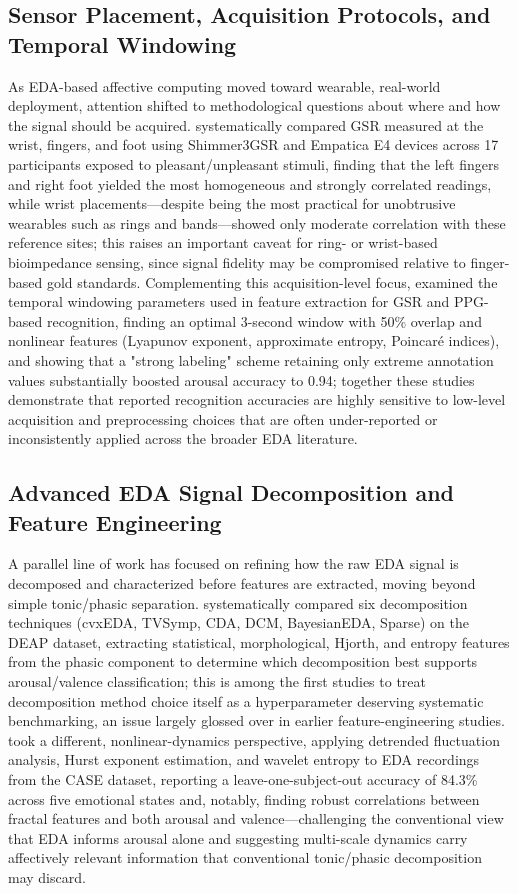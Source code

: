 \subsection{Sensor Placement, Acquisition Protocols, and Temporal Windowing}
As EDA-based affective computing moved toward wearable, real-world deployment, attention shifted to methodological questions about where and how the signal should be acquired. \cite{sanchezcomas2021correlation} systematically compared GSR measured at the wrist, fingers, and foot using Shimmer3GSR and Empatica E4 devices across 17 participants exposed to pleasant/unpleasant stimuli, finding that the left fingers and right foot yielded the most homogeneous and strongly correlated readings, while wrist placements---despite being the most practical for unobtrusive wearables such as rings and bands---showed only moderate correlation with these reference sites; this raises an important caveat for ring- or wrist-based bioimpedance sensing, since signal fidelity may be compromised relative to finger-based gold standards. Complementing this acquisition-level focus, \cite{bamonte2024determining} examined the temporal windowing parameters used in feature extraction for GSR and PPG-based recognition, finding an optimal 3-second window with 50\% overlap and nonlinear features (Lyapunov exponent, approximate entropy, Poincar{\'e} indices), and showing that a "strong labeling" scheme retaining only extreme annotation values substantially boosted arousal accuracy to 0.94; together these studies demonstrate that reported recognition accuracies are highly sensitive to low-level acquisition and preprocessing choices that are often under-reported or inconsistently applied across the broader EDA literature.

\subsection{Advanced EDA Signal Decomposition and Feature Engineering}
A parallel line of work has focused on refining how the raw EDA signal is decomposed and characterized before features are extracted, moving beyond simple tonic/phasic separation. \cite{veeranki2024comparison} systematically compared six decomposition techniques (cvxEDA, TVSymp, CDA, DCM, BayesianEDA, Sparse) on the DEAP dataset, extracting statistical, morphological, Hjorth, and entropy features from the phasic component to determine which decomposition best supports arousal/valence classification; this is among the first studies to treat decomposition method choice itself as a hyperparameter deserving systematic benchmarking, an issue largely glossed over in earlier feature-engineering studies. \cite{diaz2024fractal} took a different, nonlinear-dynamics perspective, applying detrended fluctuation analysis, Hurst exponent estimation, and wavelet entropy to EDA recordings from the CASE dataset, reporting a leave-one-subject-out accuracy of 84.3\% across five emotional states and, notably, finding robust correlations between fractal features and both arousal and valence---challenging the conventional view that EDA informs arousal alone and suggesting multi-scale dynamics carry affectively relevant information that conventional tonic/phasic decomposition may discard.

